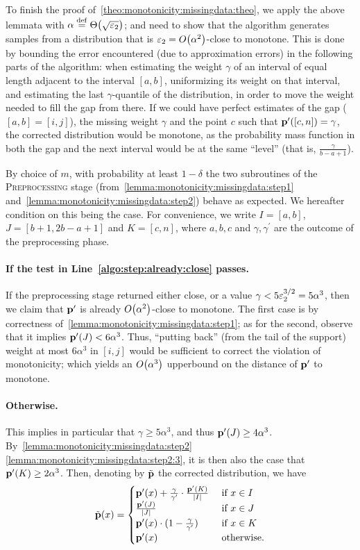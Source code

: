 \noindent To finish the proof of~\cref{theo:monotonicity:missingdata:theo}, we apply the above lemmata with  $\alpha\eqdef\bigTheta{\sqrt{\eps_2}}$; and need to show that the algorithm generates samples from a distribution that is $\eps_2=\bigO{\alpha^2}$-close to monotone. This is done by bounding the error encountered (due to approximation errors) in the following parts of the algorithm:  when estimating the weight $\gamma$ of an interval of equal length adjacent to the interval $[a,b]$, uniformizing its weight on that interval, and estimating the last $\gamma$-quantile of the distribution, in order to move the weight needed to fill the gap from there. 
If we could have perfect estimates of the gap ($[a,b]=[i,j]$), the missing weight $\gamma$ and the point $c$ such that $\mathbf{p}^\prime([c,n])=\gamma$, the corrected distribution would be monotone, as the probability mass function in both the gap and the next interval would be at the same ``level'' (that is, $\frac{\gamma}{b-a+1}$).

By choice of $m$, with probability at least $1-\delta$ the two subroutines of the \textsc{Preprocessing} stage (from~\cref{lemma:monotonicity:missingdata:step1} and~\cref{lemma:monotonicity:missingdata:step2}) behave as expected. We hereafter condition on this being the case. For convenience, we write $I=[a,b]$, $J=[b+1,2b-a+1]$ and $K=[c,n]$, where $a,b,c$ and $\gamma, \gamma^\prime$ are the outcome of the preprocessing phase.

\paragraph{If the test in Line~\ref{algo:step:already:close} passes.}
If the preprocessing stage returned either \textsf{close}, or a value $\gamma < 5\varepsilon_2^{3/2}=5\alpha^3$, then we claim that $\mathbf{p}^\prime$ is already $\bigO{\alpha^2}$-close to monotone. The first case is by correctness of~\cref{lemma:monotonicity:missingdata:step1}; as for the second, observe that it implies $\mathbf{p}^\prime(J) < 6\alpha^3$. Thus, ``putting back'' (from the tail of the support) weight at most $6\alpha^3$ in $[i,j]$ would be sufficient to correct the violation of monotonicity; which yields an $\bigO{\alpha^3}$ upperbound on the distance of $\mathbf{p}^\prime$ to monotone.

\paragraph{Otherwise.} This implies in particular that $\gamma \geq 5\alpha^3$, and thus $\mathbf{p}^\prime(J) \geq 4\alpha^3$. By~\cref{lemma:monotonicity:missingdata:step2} \ref{lemma:monotonicity:missingdata:step2:3}, it is then also the case that $\mathbf{p}^\prime(K) \geq 2\alpha^3$. Then, denoting by $\tilde{\mathbf{p}}$ the corrected distribution, we have
\[
\tilde{\mathbf{p}}(x) = \begin{cases}
 \mathbf{p}^\prime(x) + \frac{\gamma}{\gamma^\prime}\cdot\frac{\mathbf{p}^\prime(K)}{\left\lvert I \right\rvert} & \text{ if } x\in I \\
 \frac{\mathbf{p}^\prime(J)}{\left\lvert J \right\rvert} & \text{ if } x\in J \\
 \mathbf{p}^\prime(x)\cdot(1-\frac{\gamma}{\gamma^\prime}) & \text{ if } x\in K \\
 \mathbf{p}^\prime(x) & \text{ otherwise.}
\end{cases}
\]
